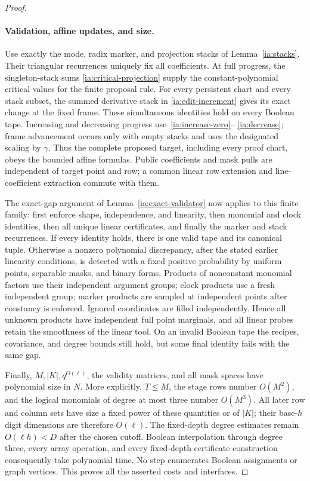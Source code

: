 \begin{proof}
\paragraph{Validation, affine updates, and size.}
Use exactly the mode, radix marker, and projection stacks of
Lemma~\ref{ia:stacks}. Their triangular recurrences uniquely fix
all coefficients. At full progress, the singleton-stack sums
\eqref{ia:critical-projection} supply the constant-polynomial
critical values for the finite proposal rule. For every persistent
chart and every stack subset, the summed derivative stack in
\eqref{ia:edit-increment} gives its exact change at the fixed frame.
These simultaneous identities hold on every Boolean tape. Increasing
and decreasing progress use~\eqref{ia:increase-zero}--
\eqref{ia:decrease}; frame advancement occurs only with empty stacks
and uses the designated scaling by \(\gamma\). Thus the complete
proposed target, including every proof chart, obeys the bounded
affine formulas. Public coefficients and mask pulls are independent
of target point and row; a common linear row extension and
line-coefficient extraction commute with them.

The exact-gap argument of Lemma~\ref{ia:exact-validator} now applies
to this finite family: first enforce shape, independence, and
linearity, then monomial and clock identities, then all unique
linear certificates, and finally the marker and stack recurrences.
If every identity holds, there is one valid tape and its canonical
tuple. Otherwise a nonzero polynomial discrepancy, after the stated
earlier linearity conditions, is detected with a fixed positive
probability by uniform points, separable masks, and binary forms.
Products of nonconstant monomial factors use their independent
argument groups; clock products use a fresh independent group;
marker products are sampled at independent points after constancy
is enforced. Ignored coordinates are filled independently. Hence
all unknown products have independent full point marginals, and
all linear probes retain the smoothness of the linear tool.
On an invalid Boolean tape the recipes, covariance, and degree
bounds still hold, but some final identity fails with the same gap.

Finally, \(M,|K|,q^{O(\ell)}\), the validity matrices, and all
mask spaces have polynomial size in \(N\). More explicitly,
\(T\le M\), the stage rows number \(O(M^2)\), and the logical
monomials of degree at most three number \(O(M^3)\). All later
row and column sets have size a fixed power of these quantities
or of \(|K|\); their base-\(h\) digit dimensions are therefore
\(O(\ell)\). The fixed-depth degree estimates remain
\(O(\ell h)<D\) after the chosen cutoff. Boolean interpolation
through degree three, every array operation, and every fixed-depth
certificate construction consequently take polynomial time. No step enumerates Boolean assignments
or graph vertices. This proves all the asserted costs and interfaces.
\end{proof}

